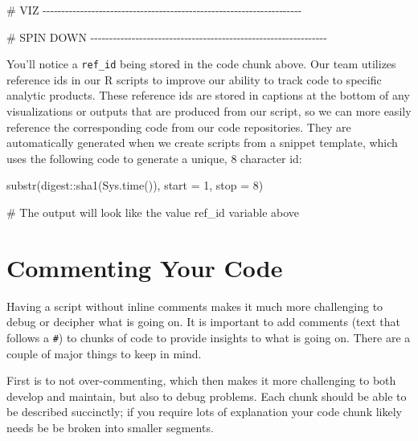 \documentclass[
  letterpaper,
  DIV=11,
  numbers=noendperiod]{scrreprt}
\newenvironment{Shaded}{\begin{snugshade}}{\end{snugshade}}
\newcommand{\AttributeTok}[1]{\textcolor[rgb]{0.40,0.45,0.13}{#1}}
\newcommand{\CommentTok}[1]{\textcolor[rgb]{0.37,0.37,0.37}{#1}}
\newcommand{\DecValTok}[1]{\textcolor[rgb]{0.68,0.00,0.00}{#1}}
\newcommand{\FunctionTok}[1]{\textcolor[rgb]{0.28,0.35,0.67}{#1}}
\newcommand{\NormalTok}[1]{\textcolor[rgb]{0.00,0.23,0.31}{#1}}
\newcommand{\SpecialCharTok}[1]{\textcolor[rgb]{0.37,0.37,0.37}{#1}}
\begin{document}
\begin{Shaded}
\begin{Highlighting}[]
\CommentTok{\# VIZ {-}{-}{-}{-}{-}{-}{-}{-}{-}{-}{-}{-}{-}{-}{-}{-}{-}{-}{-}{-}{-}{-}{-}{-}{-}{-}{-}{-}{-}{-}{-}{-}{-}{-}{-}{-}{-}{-}{-}{-}{-}{-}{-}{-}{-}{-}{-}{-}{-}{-}{-}{-}{-}{-}{-}{-}{-}{-}{-}{-}{-}{-}{-}{-}{-}{-}{-}{-}{-}}
  
\CommentTok{\# SPIN DOWN {-}{-}{-}{-}{-}{-}{-}{-}{-}{-}{-}{-}{-}{-}{-}{-}{-}{-}{-}{-}{-}{-}{-}{-}{-}{-}{-}{-}{-}{-}{-}{-}{-}{-}{-}{-}{-}{-}{-}{-}{-}{-}{-}{-}{-}{-}{-}{-}{-}{-}{-}{-}{-}{-}{-}{-}{-}{-}{-}{-}{-}{-}{-}}
\end{Highlighting}
\end{Shaded}

You'll notice a \texttt{ref\_id} being stored in the code chunk above.
Our team utilizes reference ids in our R scripts to improve our ability
to track code to specific analytic products. These reference ids are
stored in captions at the bottom of any visualizations or outputs that
are produced from our script, so we can more easily reference the
corresponding code from our code repositories. They are automatically
generated when we create scripts from a snippet template, which uses the
following code to generate a unique, 8 character id:

\begin{Shaded}
\begin{Highlighting}[]
\FunctionTok{substr}\NormalTok{(digest}\SpecialCharTok{::}\FunctionTok{sha1}\NormalTok{(}\FunctionTok{Sys.time}\NormalTok{()), }\AttributeTok{start =} \DecValTok{1}\NormalTok{, }\AttributeTok{stop =} \DecValTok{8}\NormalTok{)}

\CommentTok{\# The output will look like the value ref\_id variable above}
\end{Highlighting}
\end{Shaded}

\hypertarget{commenting-your-code}{%
\section{Commenting Your Code}\label{commenting-your-code}}

Having a script without inline comments makes it much more challenging
to debug or decipher what is going on. It is important to add comments
(text that follows a \texttt{\#}) to chunks of code to provide insights
to what is going on. There are a couple of major things to keep in mind.

First is to not over-commenting, which then makes it more challenging to
both develop and maintain, but also to debug problems. Each chunk should
be able to be described succinctly; if you require lots of explanation
your code chunk likely needs be be broken into smaller segments.
\end{document}
